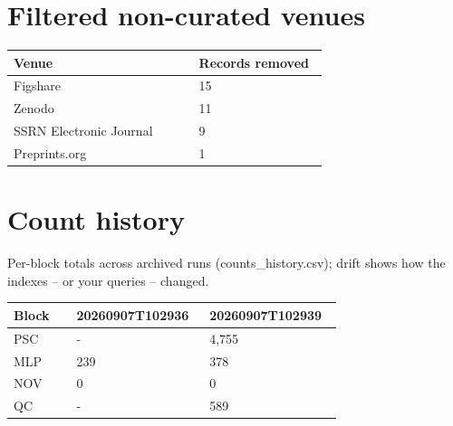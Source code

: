 \documentclass[10pt,a4paper]{article}
\begin{document}
\section*{Filtered non-curated venues}
{\scriptsize\begin{longtable}{p{0.561\linewidth}p{0.394\linewidth}}
\hline
\textbf{Venue} & \textbf{Records removed} \\ \hline
\endhead
Figshare & 15 \\
Zenodo & 11 \\
SSRN Electronic Journal & 9 \\
Preprints.org & 1 \\
\hline
\end{longtable}}
\section*{Count history}
Per-block totals across archived runs (counts\_history.csv); drift shows how the indexes -- or your queries -- changed.

{\scriptsize\begin{longtable}{p{0.180\linewidth}p{0.381\linewidth}p{0.381\linewidth}}
\hline
\textbf{Block} & \textbf{20260907T102936} & \textbf{20260907T102939} \\ \hline
\endhead
PSC & - & 4,755 \\
MLP & 239 & 378 \\
NOV & 0 & 0 \\
QC & - & 589 \\
\hline
\end{longtable}}
\end{document}
